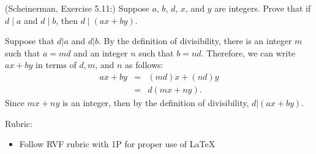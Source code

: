 \documentclass{article}
\theoremstyle{definition}
\begin{document}
\begin{question}
    (Scheinerman, Exercise 5.11:)
    Suppose $a$, $b$, $d$, $x$, and $y$ are integers.
    Prove that if $d \mid a$ and $d\mid b$,
    then $d \mid (ax+by)$.
\end{question}
\begin{solution}
Suppose that $d|a$ and $d|b$.  By the definition of divisibility, there is an integer $m$ such that $a = md$ and an integer $n$ such that $b = nd$.  Therefore, we can write $ax + by$ in terms of $d, m$, and $n$ as follows:
\begin{eqnarray*} 
ax + by & = & (md)x + (nd)y \\
	& = & d(mx + ny).
\end{eqnarray*}
Since $mx + ny$ is an integer, then by the definition of divisibility, $d | (ax + by)$.\\
{\color{red} Rubric:
\begin{itemize}
\item Follow RVF rubric with 1P for proper use of \LaTeX
\end{itemize}}
\end{solution}
\end{document}
